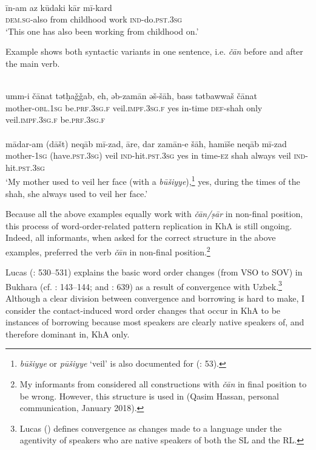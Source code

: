 \documentclass[output=paper,nonflat]{langsci/langscibook}
\begin{document}
\\
\gll īn-am az kūdaki kār mī-kard \\
     \textsc{dem.sg}-also from childhood work \textsc{ind}{}-do.\textsc{pst.3sg}\\
\glt ‘This one has also been working from childhood on.’
\z\z

Example  shows both syntactic variants in one sentence, i.e. \textit{čān} before and after the main verb.

\ea\label{mother} \\
\gll umm-i čānat tətḥaǧǧab, eh, əb-zamān əš-šāh, bass tətbawwaš čānat\\
     mother-\textsc{obl.1sg} be\textsc{.prf.3sg.f} veil.\textsc{impf.3sg.f} yes in-time \textsc{def}{}-shah only veil.\textsc{impf.3sg.f} be\textsc{.prf.3sg.f}\\

\\
\gll mādar-am (dāšt) neqāb mī-zad, āre, dar zamān-e šāh, hamīše neqāb mī-zad \\
     mother-\textsc{1sg} (have.\textsc{pst.3sg}) veil \textsc{ind}-hit.\textsc{pst.3sg} yes in time-\textsc{ez} shah always veil \textsc{ind}-hit.\textsc{pst.3sg}\\
\glt  ‘My mother used to veil her face (with a \textit{būšiyye}),\footnote{\textit{būšiyye} or \textit{pūšiyye} ‘veil’ is also documented for   (\citealt{WoodheadEtAl1967}: 53).} yes, during the times of the shah, she always used to veil her face.’ 
\z\z

Because all the above examples equally work with \textit{čān/ṣār} in non-final position, this process of word-order-related pattern {replication} in KhA is still ongoing. Indeed, all informants, when asked for the correct structure in the above examples, preferred the verb \textit{čān} in non-final position.\footnote{My informants from  considered all constructions with \textit{čān} in final position to be wrong. However, this structure is used in   (Qasim Hassan, personal communication, January 2018).}

Lucas (\citeyear{Lucas2015}: 530–531) explains the basic {word order} changes (from VSO to SOV) in Bukhara  (cf. \citealt{Ratcliffe2005}: 143–144; and \citealt{Versteegh2010}: 639) as a result of {convergence} with Uzbek.\footnote{Lucas (\citeyear[525]{Lucas2015}) defines {convergence} as changes made to a language under the agentivity of speakers who are native speakers of both the {SL} and the {RL}.} Although a clear division between {convergence} and borrowing is hard to make, I consider the contact-induced {word order} changes that occur in KhA to be instances of borrowing because most speakers are clearly native speakers of, and therefore dominant in, KhA only.
\end{document}
